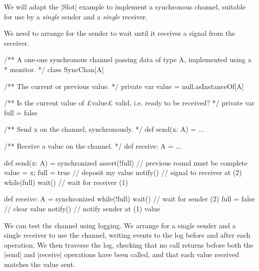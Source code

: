 \begin{slide}

We will adapt the |Slot| example to implement a synchronous channel, suitable
for use by a \emph{single} sender and a \emph{single} receiver.

We need to arrange for the sender to wait until it receives a signal from
the receiver. 
\end{slide}


\begin{slide}

\begin{scala}
/** A one-one synchronous channel passing data of type A, implemented using a
  * monitor. */
class SyncChan[A]{
  /** The current or previous value. */
  private var value = null.asInstanceOf[A]

  /** Is the current value of £value£ valid, i.e. ready to be received? */
  private var full = false

  /** Send x on the channel, synchronously. */
  def send(x: A) = ...

  /** Receive a value on the channel. */
  def receive: A = ...
}
\end{scala}
\end{slide}



\begin{slide}

\begin{scala}
  def send(x: A) = synchronized{
    assert(!full)           // previous round must be complete
    value = x; full = true // deposit my value 
    notify()                // signal to receiver at (2)
    while(full) wait()      // wait for receiver (1)
  }

  def receive: A = synchronized{
    while(!full) wait()     // wait for sender (2)
    full = false            // clear value 
    notify()                // notify sender at (1)
    value
  }
\end{scala}
\end{slide}


\begin{slide}

We can test the channel using logging.  We arrange for a single sender and a
single receiver to use the channel, writing events to the log before and after
each operation.  We then traverse the log, checking that no call returns
before both the |send| and |receive| operations have been called, and that
each value received matches the value sent. 
\end{slide}

